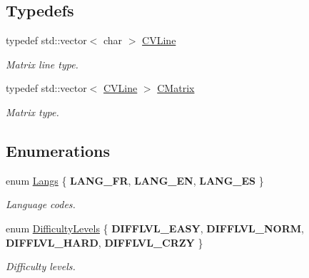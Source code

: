\subsection*{Typedefs}
\begin{DoxyCompactItemize}
\item 
\hypertarget{namespace_chase_game_aa09cf1806d3b1f59d36cfabadeaca6a2}{typedef std\-::vector$<$ char $>$ \hyperlink{namespace_chase_game_aa09cf1806d3b1f59d36cfabadeaca6a2}{C\-V\-Line}}\label{namespace_chase_game_aa09cf1806d3b1f59d36cfabadeaca6a2}

\begin{DoxyCompactList}\small\item\em Matrix line type. \end{DoxyCompactList}\item 
\hypertarget{namespace_chase_game_a469449f9237e59efce3982127366c550}{typedef std\-::vector$<$ \hyperlink{namespace_chase_game_aa09cf1806d3b1f59d36cfabadeaca6a2}{C\-V\-Line} $>$ \hyperlink{namespace_chase_game_a469449f9237e59efce3982127366c550}{C\-Matrix}}\label{namespace_chase_game_a469449f9237e59efce3982127366c550}

\begin{DoxyCompactList}\small\item\em Matrix type. \end{DoxyCompactList}\end{DoxyCompactItemize}
\subsection*{Enumerations}
\begin{DoxyCompactItemize}
\item 
enum \hyperlink{namespace_chase_game_a2501a45afa3eb11b10e04d79a8349796}{Langs} \{ {\bfseries L\-A\-N\-G\-\_\-\-F\-R}, 
{\bfseries L\-A\-N\-G\-\_\-\-E\-N}, 
{\bfseries L\-A\-N\-G\-\_\-\-E\-S}
 \}
\begin{DoxyCompactList}\small\item\em Language codes. \end{DoxyCompactList}\item 
enum \hyperlink{namespace_chase_game_a5d785ea23167a3b7e44e045097cd457e}{Difficulty\-Levels} \{ {\bfseries D\-I\-F\-F\-L\-V\-L\-\_\-\-E\-A\-S\-Y}, 
{\bfseries D\-I\-F\-F\-L\-V\-L\-\_\-\-N\-O\-R\-M}, 
{\bfseries D\-I\-F\-F\-L\-V\-L\-\_\-\-H\-A\-R\-D}, 
{\bfseries D\-I\-F\-F\-L\-V\-L\-\_\-\-C\-R\-Z\-Y}
 \}
\begin{DoxyCompactList}\small\item\em Difficulty levels. \end{DoxyCompactList}\end{DoxyCompactItemize}

